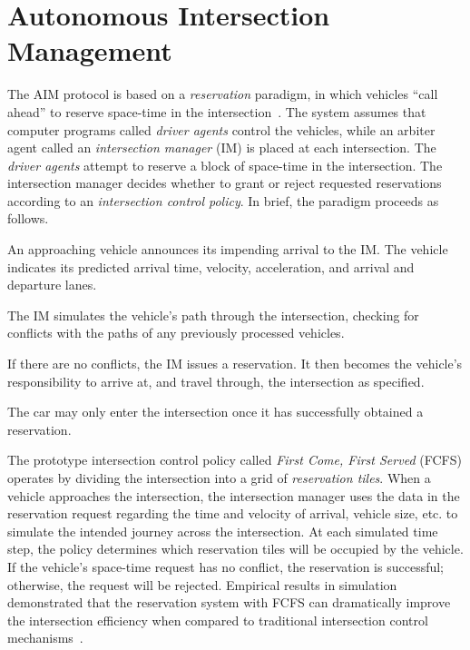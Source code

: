 \section{Autonomous Intersection Management}
\label{sec:aim}

The AIM protocol is based on a \emph{reservation} paradigm, in which
vehicles ``call ahead'' to reserve space-time in the
intersection~\cite{bib:Dresner08Multiagent}. The system assumes that
computer programs called \emph{driver agents} control the vehicles,
while an arbiter agent called an \emph{intersection manager} (IM) is
placed at each intersection.  The \emph{driver agents} attempt to reserve a
block of space-time in the intersection.  The intersection manager
decides whether to grant or reject requested reservations according to
an \emph{intersection control policy}.  In brief, the paradigm
proceeds as follows.
\begin{small_ind_s_itemize}
\item An approaching vehicle announces its impending arrival to the
IM.  The vehicle indicates its predicted arrival time, velocity,
acceleration, and arrival and departure lanes.
\item The IM simulates the vehicle's path through
the intersection, checking for conflicts with the paths of any
previously processed vehicles.
\item If there are no conflicts, the IM issues a
reservation. It then becomes the vehicle's responsibility to arrive at, and
travel through, the intersection as specified.
\item The car may only enter the intersection once it has successfully
obtained a reservation.
\end{small_ind_s_itemize}
The prototype intersection control policy called \emph{First Come,
First Served} (FCFS) operates by dividing the intersection into a grid
of \emph{reservation tiles}. When a vehicle approaches the
intersection, the intersection manager uses the data in the
reservation request regarding the time and velocity of arrival,
vehicle size, etc. to simulate the intended journey across the
intersection.  At each simulated time step, the policy determines
which reservation tiles will be occupied by the vehicle.  If the
vehicle's space-time request has no conflict, the reservation is
successful; otherwise, the request will be rejected.
Empirical results in simulation demonstrated that the 
reservation system with FCFS can dramatically improve the intersection
efficiency when compared to traditional intersection control
mechanisms~\cite{bib:Dresner08Multiagent}.


